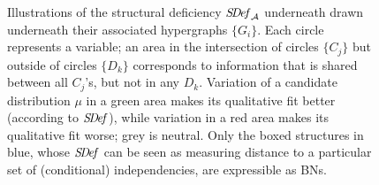 \begin{figure}
	\addtocounter{figure}{-1} %
	\caption[Illustrations of the information deficiency ($\SDef_{\!\Ar})$ 
		for various hypergraphs $\Ar$]
	{
        Illustrations of the structural deficiency $\mathit{S\mskip-3.5muD\mskip-2.5mue\mskip-1.5muf}_{\mathcal A}$ underneath
          drawn underneath their
		  associated hypergraphs $\{ G_i\}$. Each circle represents a
		  variable; an area in the intersection of circles $\{C_j\}$
		  but outside of circles $\{D_k\}$ corresponds to information
		  that is shared between all $C_j$'s, but not in any
		  $D_k$. Variation of a candidate distribution $\mu$ in a
		  green area makes its qualitative fit better (according to
		  $\mathit{S\mskip-3.5muD\mskip-2.5mue\mskip-1.5muf}{}$), while variation in a red area makes its
		  qualitative fit worse; grey is neutral.
		  Only the boxed structures in blue,
		  whose $\mathit{S\mskip-3.5muD\mskip-2.5mue\mskip-1.5muf}$ can be seen as measuring distance to a particular set of (conditional) independencies, are expressible as BNs.}
	\label{fig:sdef-example-panel}
\end{figure}

